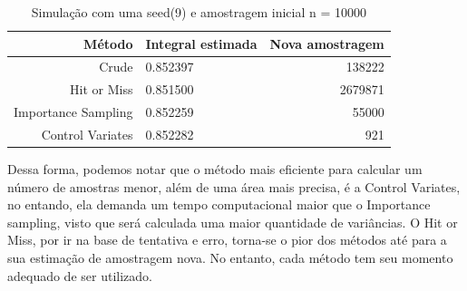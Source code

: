 \documentclass[a4paper]{article}
\begin{document}
\begin{table}[h]
\centering
\caption{Simulação com uma seed(9) e amostragem inicial n = 10000}
\vspace{0.5cm}
\begin{tabular}{r|lr}

Método & Integral estimada & Nova amostragem \\ %
\hline                               %
Crude & 0.852397       & 138222 \\
Hit or Miss & 0.851500   & 2679871 \\
Importance Sampling & 0.852259             & 55000  \\
Control Variates & 0.852282         & 921 \\

\end{tabular}
\end{table}

Dessa forma, podemos notar que o método mais eficiente para calcular um número de amostras menor, além de uma área mais precisa, é a Control Variates, no entando, ela demanda um tempo computacional maior que o Importance sampling, visto que será calculada uma maior quantidade de variâncias. O Hit or Miss, por ir na base de tentativa e erro, torna-se o pior dos métodos até para a sua estimação de amostragem nova. No entanto, cada método tem seu momento adequado de ser utilizado.
\end{document}
